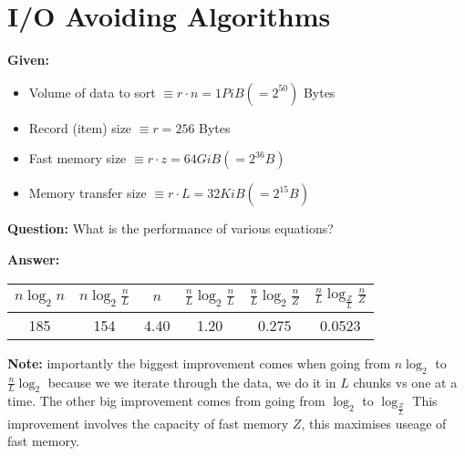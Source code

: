 \documentclass{amsart}
\begin{document}
	\section{I/O Avoiding Algorithms}
	\begin{mdframed}[style=Quiz]
		\textbf{Given:}
		\begin{itemize}
			\item Volume of data to sort $\equiv r \cdot n = 1 PiB (=2^{50})$ Bytes
			\item Record (item) size $\equiv r = 256$ Bytes
			\item Fast memory size $\equiv r \cdot z = 64 GiB (=2^{36}B)$
			\item Memory transfer size $\equiv r \cdot L = 32 KiB (=2^{15}B)$
		\end{itemize}
		
		\noindent
		\textbf{Question:} What is the performance of various equations?
		
		\noindent
		\textbf{Answer:}
		\begin{center}
			
			\begin{tabular}{cccccc}
				$n\log_2n$ & $n\log_2\frac{n}{L}$ & $n$ & $\frac{n}{L}\log_2\frac{n}{L}$ &$\frac{n}{L}\log_2\frac{n}{Z}$ &$\frac{n}{L}\log_{\frac{Z}{L}}\frac{n}{Z}$\\
				\hline
				185& 154& 4.40& 1.20 &0.275& 0.0523 \\
			\end{tabular}
		\end{center}
		
		\noindent
		\textbf{Note:} importantly the biggest improvement comes when going from $n\log_2$ to $\frac{n}{L}\log_2$ because we we iterate through the data, we do it in $L$ chunks vs one at a time. The other big improvement comes from going from $\log_2$ to $\log_{\frac{Z}{L}}$ This improvement involves the capacity of fast memory $Z$, this maximises useage of fast memory.
	\end{mdframed}
\end{document}
